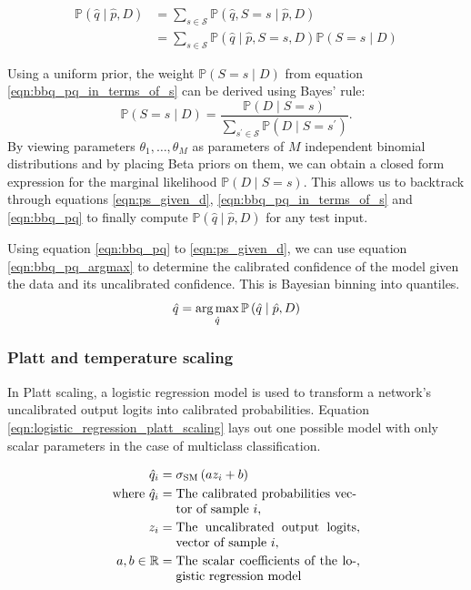 \begin{align}
\label{eqn:bbq_pq}
\mathbb{P}\left(\hat{q} \mid \hat{p}, D\right) &= \sum_{s \in \mathcal{S}} \mathbb{P}\left(\hat{q}, S=s \mid \hat{p}, D\right) \\
\label{eqn:bbq_pq_in_terms_of_s}
&= \sum_{s \in \mathcal{S}} \mathbb{P}\left(\hat{q} \mid \hat{p}, S=s, D\right) \mathbb{P}(S=s \mid D)
\end{align}

Using a uniform prior, the weight $\mathbb{P}(S=s \mid D)$ from equation \ref{eqn:bbq_pq_in_terms_of_s} can be derived using Bayes' rule:
\begin{equation}
\label{eqn:ps_given_d}
\mathbb{P}(S=s \mid D)=\frac{\mathbb{P}(D \mid S=s)}{\sum_{s^{\prime} \in \mathcal{S}} \mathbb{P}\left(D \mid S=s^{\prime}\right)}.
\end{equation}
By viewing parameters $\theta_{1}, \ldots, \theta_{M}$ as parameters of $M$ independent binomial distributions and by placing Beta priors on them, we can obtain a closed form expression for the marginal likelihood $\mathbb{P}(D \mid S=s)$. This allows us to backtrack through equations \ref{eqn:ps_given_d}, \ref{eqn:bbq_pq_in_terms_of_s} and \ref{eqn:bbq_pq} to finally compute $\mathbb{P}\left(\hat{q} \mid \hat{p}, D\right)$ for any test input.

Using equation \ref{eqn:bbq_pq} to \ref{eqn:ps_given_d}, we can use equation \ref{eqn:bbq_pq_argmax} to determine the calibrated confidence of the model given the data and its uncalibrated confidence. This is Bayesian binning into quantiles.
\begin{equation}
\label{eqn:bbq_pq_argmax}
\hat{q} = \operatorname*{arg\,max}_{\hat{q}} \mathbb{P}\left(\hat{q} \mid \hat{p}, D\right)
\end{equation}

\subsubsection{Platt and temperature scaling}
In Platt scaling, a logistic regression model is used to transform a network's uncalibrated output logits into calibrated probabilities. Equation \ref{eqn:logistic_regression_platt_scaling} lays out one possible model with only scalar parameters in the case of multiclass classification.

\begin{align}
\label{eqn:logistic_regression_platt_scaling}
\hat{q}_{i} &= \sigma_{\mathrm{SM}}\left(a z_{i} + b\right) \\ \nonumber
\text{where}~\hat{q}_{i} &= \parbox[t]{5cm}{The calibrated probabilities vector of sample $i$,} \\ \nonumber
z_{i} &= \parbox[t]{5cm}{The uncalibrated output logits vector of sample $i$,}, \\ \nonumber
a, b \in \mathbb{R} &= \parbox[t]{5cm}{The scalar coefficients of the logistic regression model}, \\ \nonumber
\end{align}

